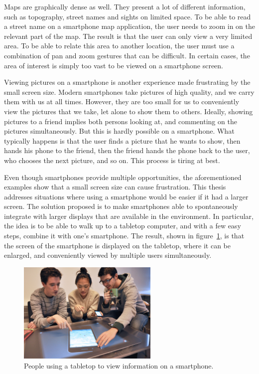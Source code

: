 Maps are graphically dense as well.
They present a lot of different information, such as topography, street names and sights on limited space.
To be able to read a street name on a smartphone map application, the user needs to zoom in on the relevant part of the map.
The result is that the user can only view a very limited area.
To be able to relate this area to another location, the user must use a combination of pan and zoom gestures that can be difficult.
In certain cases, the area of interest is simply too vast to be viewed on a smartphone screen.

Viewing pictures on a smartphone is another experience made frustrating by the small screen size.
Modern smartphones take pictures of high quality, and we carry them with us at all times.
However, they are too small for us to conveniently view the pictures that we take, let alone to show them to others.
Ideally, showing pictures to a friend implies both persons looking at, and commenting on the pictures simultaneously.
But this is hardly possible on a smartphone.
What typically happens is that the user finds a picture that he wants to show, then hands his phone to the friend, then the friend hands the phone back to the user, who chooses the next picture, and so on.
This process is tiring at best.

Even though smartphones provide multiple opportunities, the aforementioned examples show that a small screen size can cause frustration.
This thesis addresses situations where using a smartphone would be easier if it had a larger screen.
The solution proposed is to make smartphones able to spontaneously integrate with larger displays that are available in the environment.
In particular, the idea is to be able to walk up to a tabletop computer, and with a few easy steps, combine it with one's smartphone.
The result, shown in figure~\ref{fig:tide}, is that the screen of the smartphone is displayed on the tabletop, where it can be enlarged, and conveniently viewed by multiple users simultaneously.

\begin{figure}[htb]
  \centering
    \includegraphics[width=0.6\textwidth]{images/tide456}
  \caption{People using a tabletop to view information on a smartphone.}
  \label{fig:tide}
\end{figure}

